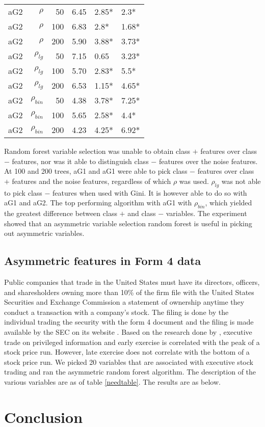 \documentclass[twoside,11pt]{article}
\begin{document}
\begin{table}
\begin{tabular}{rrrp{2.5cm}p{2.5cm}p{2.5cm}}
\hline
aG2   & $\rho$ & 50    & 6.45  & 2.85* & 2.3* \bigstrut[t]\\
aG2   & $\rho$ & 100   & 6.83  & 2.8*  & 1.68* \\
aG2   & $\rho$ & 200   & 5.90  & 3.88* & 3.73* \bigstrut[b]\\
\hline
aG2   & $\rho_{lg}$ & 50    & 7.15  & 0.65  & 3.23* \bigstrut[t]\\
aG2   & $\rho_{lg}$ & 100   & 5.70  & 2.83* & 5.5* \\
aG2   & $\rho_{lg}$ & 200   & 6.53  & 1.15* & 4.65* \bigstrut[b]\\
\hline
aG2   & $\rho_{bin}$ & 50    & 4.38  & 3.78* & 7.25* \bigstrut[t]\\
aG2   & $\rho_{bin}$ & 100   & 5.65  & 2.58* & 4.4* \\
aG2   & $\rho_{bin}$ & 200   & 4.23  & 4.25* & 6.92* \bigstrut[b]\\
\hline
\end{tabular}%

\label{tab:asymmetricfeaturesresults2}%
\end{table}%

Random forest variable selection was unable to obtain class $+$ features over class $-$ features, nor was it able to distinguish class $-$ features over the noise features. At 100 and 200 trees, aG1 and aG1 were able to pick class $-$ features over class $+$ features and the noise features, regardless of which $\rho$ was used. $\rho_{lg}$ was not able to pick class $-$ features when used with Gini. It is however able to do so with aG1 and aG2. The top performing algorithm with aG1 with  $\rho_{bin}$, which yielded the greatest difference between class $+$ and class $-$ variables. The experiment showed that an asymmetric variable selection random forest is useful in picking out asymmetric variables. 

\subsection{Asymmetric features in Form 4 data}
Public companies that trade in the United States must have its directors, officers, and sharesholders owning more than 10\% of the firm file with the United States Securities and Exchange Commission a statement of ownership anytime they conduct a transaction with a company's stock. The filing is done by the individual trading the security with the form 4 document and the filing is made available by the SEC on its website \citep{SECWebsite}. Based on the research done by \citet{Cicero09}, executive trade on privileged information and early exercise is correlated with the peak of a stock price run. However, late exercise does not correlate with the bottom of a stock price run. We picked 20 variables that are associated with executive stock trading and ran the asymmetric random forest algorithm. The description of the various variables are as of table \ref{needtable}. The results are as below.  


\section{Conclusion}



\end{document}
